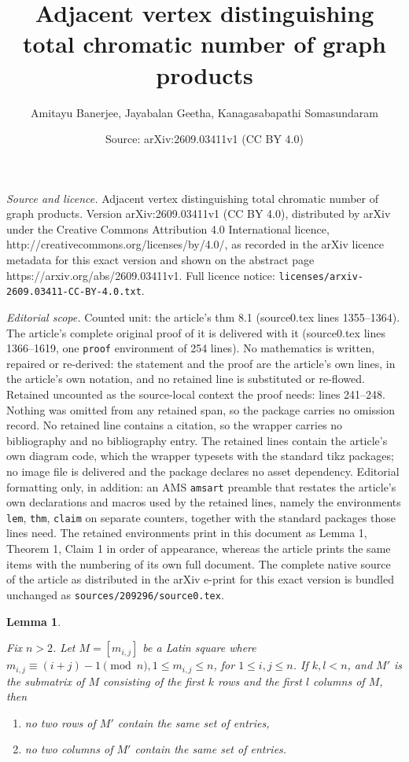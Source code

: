\documentclass[10pt,a4paper]{amsart}
\title{Adjacent vertex distinguishing total chromatic number of graph products}
\author{Amitayu Banerjee, Jayabalan Geetha, Kanagasabapathi Somasundaram}
\date{Source: arXiv:2609.03411v1 (CC BY 4.0)}
\newtheorem{lem}{Lemma}
\begin{document}
\maketitle

\noindent\emph{Source and licence.} Adjacent vertex distinguishing total chromatic number of graph products. Version arXiv:2609.03411v1 (CC BY 4.0), distributed by arXiv under the Creative Commons Attribution 4.0 International licence, http://creativecommons.org/licenses/by/4.0/, as recorded in the arXiv licence metadata for this exact version and shown on the abstract page https://arxiv.org/abs/2609.03411v1. Full licence notice: \texttt{licenses/arxiv-2609.03411-CC-BY-4.0.txt}.\par\smallskip

\noindent\textit{Editorial scope.} Counted unit: the article's thm 8.1 (source0.tex lines 1355--1364). The article's complete original proof of it is delivered with it (source0.tex lines 1366--1619, one \texttt{proof} environment of 254 lines). No mathematics is written, repaired or re-derived: the statement and the proof are the article's own lines, in the article's own notation, and no retained line is substituted or re-flowed.  Retained uncounted as the source-local context the proof needs: lines 241--248.  Nothing was omitted from any retained span, so the package carries no omission record.  No retained line contains a citation, so the wrapper carries no bibliography and no bibliography entry.  The retained lines contain the article's own diagram code, which the wrapper typesets with the standard tikz packages; no image file is delivered and the package declares no asset dependency.  Editorial formatting only, in addition: an AMS \texttt{amsart} preamble that restates the article's own declarations and macros used by the retained lines, namely the environments \texttt{lem}, \texttt{thm}, \texttt{claim} on separate counters, together with the standard packages those lines need.  The retained environments print in this document as Lemma 1, Theorem 1, Claim 1 in order of appearance, whereas the article prints the same items with the numbering of its own full document.  The complete native source of the article as distributed in the arXiv e-print for this exact version is bundled unchanged as \texttt{sources/209296/source0.tex}.
\begin{lem}\label{Lemma 2.2}
    {\em Fix $n>2$. Let $M = [m_{i,j}]$ be a Latin square where $m_{i,j} \equiv (i + j)-1 \pmod{n}, 1 \leq m_{i,j} \leq n$, for $1 \leq i, j \leq n$. If $k,l<n$, and $M'$ is the submatrix of $M$ consisting of the first $k$ rows and the first $l$ columns of $M$, then 
    \begin{enumerate}
        \item no two rows of $M'$ contain the same set of entries,
        \item no two columns of $M'$ contain the same set of entries.
    \end{enumerate}
    }
\end{lem}
\end{document}
